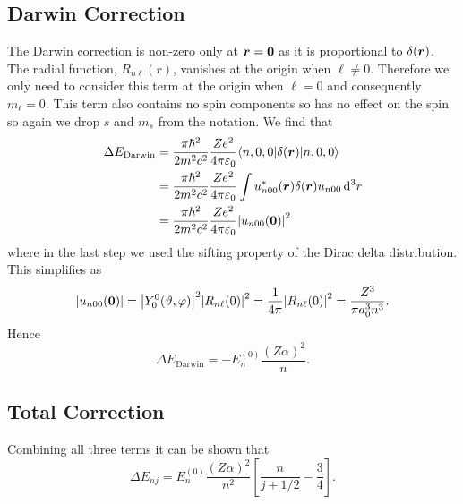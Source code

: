     \subsection{Darwin Correction}
    The Darwin correction is non-zero only at \(\bm{r} = \bm{0}\) as it is proportional to \(\delta(\bm{r})\).
    The radial function, \(R_{n\ell}(r)\), vanishes at the origin when \(\ell \ne 0\).
    Therefore we only need to consider this term at the origin when \(\ell = 0\) and consequently \(m_\ell = 0\).
    This term also contains no spin components so has no effect on the spin so again we drop \(s\) and \(m_s\) from the notation.
    We find that
    \begin{align*}
        \Delta E_{\mathrm{Darwin}} &= \frac{\pi\hbar^2}{2m^2c^2}\frac{Ze^2}{4\pi\varepsilon_0}\langle {n, 0, 0} \vert\delta(\bm{r})\vert {n, 0, 0} \rangle\\
        &= \frac{\pi\hbar^2}{2m^2c^2}\frac{Ze^2}{4\pi\varepsilon_0}\int u_{n00}^*(\bm{r})\delta(\bm{r})u_{n00} \dd[3]{r}\\
        &= \frac{\pi\hbar^2}{2m^2c^2}\frac{Ze^2}{4\pi\varepsilon_0}\abs{u_{n00}(\bm{0})}^2
    \end{align*}
    where in the last step we used the sifting property of the Dirac delta distribution.
    This simplifies as
    \[\abs{u_{n00}(\bm{0})} = \abs{Y_0^0(\vartheta, \varphi)}^2\abs{R_{n\ell}(0)}^2 = \frac{1}{4\pi}\abs{R_{n\ell}(0)}^2 = \frac{Z^3}{\pi a_0^3n^3}.\]
    Hence
    \[\Delta E_{\mathrm{Darwin}} = -E_n^{(0)}\frac{(Z\alpha)^2}{n}.\]
    
    \subsection{Total Correction}
    Combining all three terms it can be shown that
    \[\Delta E_{nj} = E_n^{(0)}\frac{(Z\alpha)^2}{n^2}\left[\frac{n}{j + 1/2} - \frac{3}{4}\right].\]
    
